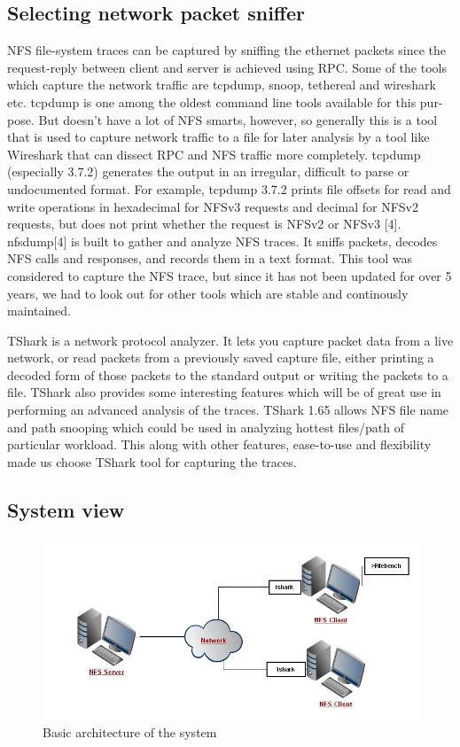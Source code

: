 \documentclass[conference]{IEEEtran}
\begin{document}
\subsection{Selecting network packet sniffer}
NFS file-system traces can be captured by sniffing the ethernet packets since
the request-reply between client and server is achieved using RPC. Some of the tools which capture the
network traffic are tcpdump, snoop, tethereal and wireshark etc.
tcpdump is one among the oldest command line tools available for this pur-
pose. But doesn’t have a lot of NFS smarts, however, so generally this is
a tool that is used to capture network traffic to a file for later analysis by
a tool like Wireshark that can dissect RPC and NFS traffic more completely. tcpdump (especially 3.7.2) generates the output in an irregular, difficult to parse or undocumented format. For example, tcpdump 3.7.2 prints file offsets for read and write operations in hexadecimal for NFSv3 requests and decimal for NFSv2 requests, but does not print whether the request is NFSv2 or NFSv3 [4]. nfsdump[4] is built to gather and analyze NFS traces. It sniffs packets, decodes NFS calls and responses, and records them in a text format. This tool
was considered to capture the NFS trace, but since it has not been updated
for over 5 years, we had to look out for other tools which are stable and continously maintained. 

TShark is a network protocol analyzer. It lets you capture packet data from a live network, or read packets from a previously saved capture file, either printing a decoded form of those packets to the standard output or writing the packets to a file. TShark also provides some interesting features which will be of great use in performing an advanced analysis of the traces. TShark 1.65 allows NFS file name and path snooping which could be used in analyzing hottest files/path of particular workload. This along with other features, ease-to-use and flexibility made us choose TShark tool for capturing the traces.

\subsection{System view}

\begin{figure}[htb]
\centering
\includegraphics[width=\linewidth]{Arch.jpg}
\caption{Basic architecture of the system}
\label{fig:awesome_image}
\end{figure}
\end{document}
